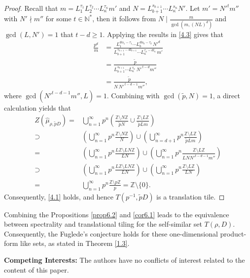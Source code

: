 \documentclass[11pt]{article}
\numberwithin{equation}{section}
\begin{document}
\begin{proof}
Recall that $m = L_1^{\tau_1} L_2^{\tau_2} \cdots L_\kappa^{\tau_\kappa} m'$ and $N=L_{b+1}^{s_{b+1}}\cdots L_{\kappa}^{s_{\kappa}}N'$. Let $m'=N'^tm''$ with $N'\nmid m''$ for some $t\in\mathbb{N}^*$, then it follows from $N\mid\frac{m}{\gcd(m,(NL)^d)}$ and $\gcd(L,N')=1$  that $t-d\geq 1$. Applying the results in \eqref{4.3} gives that
\begin{align*}
	\frac{p^d}{m}
	&= \frac{L_1^{d\alpha_1-\tau_1}\cdots L_b^{d\alpha_b-\tau_b}\,N'^d}
	{L_{b+1}^{\tau_{b+1}-dl_{b+1}}\cdots L_{\kappa}^{\tau_{\kappa}-dl_{\kappa}}\,m'} \\[0.4em]
	&= \frac{\tilde{p}}
	{L_{b+1}^{s_{b+1}}\cdots L_{\kappa}^{s_{\kappa}}\,N'^{\,t-d} m''} \\[0.4em]
	&= \frac{\tilde{p}}
	{N\,N'^{\,t-d-1} m''},
\end{align*}
	where $\gcd(N'^{t-d-1}m'',L)=1$. Combining with $\gcd(\tilde{p}, N)=1$, a direct calculation yields that
	\allowdisplaybreaks 
	\begin{align*}
		Z(\hat{\mu}_{\rho,\tilde{p}D})=& \bigcup^{\infty}_{n=1} p^n \left(\frac{\mathbb{Z} \setminus N\mathbb{Z}}{\tilde{p}N} \cup \frac{\mathbb{Z} \setminus L\mathbb{Z}}{\tilde{p}Lm}\right)   \\
		\supset & \left(\bigcup^{\infty}_{n=1} p^n \frac{\mathbb{Z} \setminus N\mathbb{Z}}{N}\right)\cup
		\left(\bigcup^{\infty}_{n=d+1} p^n \frac{\mathbb{Z} \setminus L\mathbb{Z}}{\tilde{p}Lm}\right)   \\
		=& \left(\bigcup^{\infty}_{n=1} p^n \frac{L\mathbb{Z} \setminus LN\mathbb{Z}}{LN}\right)\cup
		\left(\bigcup^{\infty}_{n=1} p^n \frac{\mathbb{Z} \setminus L\mathbb{Z}}{LNN'^{t-d-1}m''}\right)  \\
		\supset& \left(\bigcup^{\infty}_{n=1} p^n \frac{L\mathbb{Z} \setminus LN\mathbb{Z}}{LN}\right)\cup
		\left(\bigcup^{\infty}_{n=1} p^n \frac{\mathbb{Z} \setminus L\mathbb{Z}}{LN}\right)  \\
		=&\bigcup^{\infty}_{n=1}p^n\frac{\mathbb{Z} \setminus p\mathbb{Z}}{p}=\mathbb{Z} \setminus \{0\}.
	\end{align*}
	Consequently, \eqref{4.1} holds, and hence $T(p^{-1},\tilde{p}D)$ is a translation tile.
\end{proof}


Combining the  Propositions \ref{prop6.2} and \ref{cor6.1} leads to the equivalence between spectrality and translational tiling for the self-similar set $T(\rho, D)$. Consequently, the Fuglede's conjecture holds for these one-dimensional product-form like sets, as stated in Theorem \ref{1.3}.


\bigskip
{\bf Competing Interests:} {The authors have no conflicts of interest related to the content of this paper. }






\end{document}

